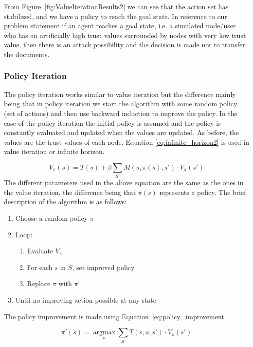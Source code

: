 From Figure~\ref{fig:ValueIterationResults2} we can see that the action set has
stabilized, and we
have a policy to reach the goal state. In reference to our problem statement if
an agent reaches a goal state, i.e. a simulated node/user who has an
artificially high trust values surrounded by nodes with very low trust value,
then there is an attack possibility and the decision is made not to transfer the
documents.

\subsubsection{Policy Iteration}
The policy iteration works similar to value iteration but the difference
mainly being that in policy iteration we start the algorithm with some random
policy (set of actions) and then use backward induction to improve the
policy. In the case of the
policy iteration the initial policy is assumed and the policy is constantly
evaluated and updated when the values are updated. As before, the values are the 
trust values of each node.  Equation \ref{eq:infinite_horizon2} is used in value 
iteration or infinite horizon.

\begin{equation} 
    \label{eq:infinite_horizon2}
    V_\pi(s) = T(s) + \beta \sum_{S'} M(s,\pi(s),s') \cdot V_\pi(s')
\end{equation}
The different parameters used in the above equation are the same as the ones in
the value iteration, the difference being that $\pi(s)$ represents a policy. The brief
description of the algorithm is as follows:
\begin{enumerate}
    \item Choose a random policy $\pi$
    \item Loop: 
        \begin{enumerate}
            \item Evaluate $V_\pi$ 
            \item For each $s$ in $S$, set improved policy
            \item Replace $\pi$ with $\pi^\prime$ 
        \end{enumerate}
        \item Until no improving action possible at any state
\end{enumerate}

The policy improvement is made using Equation~\ref{eq:policy_improvement}

\begin{equation} 
    \label{eq:policy_improvement}
    \pi'(s) = \operatorname*{argmax}_a \sum_{S'} T(s,a,s') \cdot V_\pi(s')
\end{equation}


